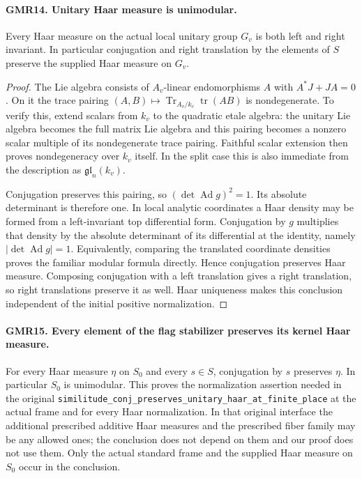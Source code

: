 \paragraph{GMR14. Unitary Haar measure is unimodular.}
\label{claim:GMR14}
Every Haar measure on the actual local unitary group $G_v$ is both
left and right invariant.  In particular conjugation and right
translation by the elements of $S$ preserve the supplied Haar measure
on $G_v$.

\begin{proof}
The Lie algebra consists of $A_v$-linear endomorphisms $A$ with
$A^*J+JA=0$.  On it the trace pairing
$(A,B)\mapsto\operatorname{Tr}_{A_v/k_v}\operatorname{tr}(AB)$ is
nondegenerate.  To verify this, extend scalars from $k_v$ to the
quadratic etale algebra: the unitary Lie algebra becomes the full
matrix Lie algebra and this pairing becomes a nonzero scalar
multiple of its nondegenerate trace pairing.  Faithful scalar
extension then proves nondegeneracy over $k_v$ itself.  In the split
case this is also immediate from the description as
$\mathfrak{gl}_n(k_v)$.

Conjugation preserves this pairing, so
$(\det\operatorname{Ad}g)^2=1$.  Its absolute determinant is therefore
one.  In local analytic coordinates a Haar density may be formed
from a left-invariant top differential form.  Conjugation by $g$
multiplies that density by the absolute determinant of its
differential at the identity, namely
$|\det\operatorname{Ad}g|=1$.
Equivalently, comparing the translated coordinate densities proves
the familiar modular formula directly.  Hence conjugation preserves
Haar measure.  Composing conjugation with a left translation gives
a right translation, so right translations preserve it as well.
Haar uniqueness makes this conclusion independent of the initial
positive normalization.
\end{proof}

\paragraph{GMR15. Every element of the flag stabilizer preserves its kernel Haar measure.}
\label{claim:GMR15}
For every Haar measure $\eta$ on $S_0$ and every $s\in S$,
conjugation by $s$ preserves $\eta$.  In particular $S_0$ is
unimodular.  This proves the normalization assertion needed in the
original \texttt{similitude\_conj\_preserves\_unitary\_haar\_at\_finite\_place}
at the actual frame and for every Haar normalization.
In that original interface the additional prescribed additive Haar
measures and the prescribed fiber family may be any allowed ones;
the conclusion does not depend on them and our proof does not use
them.  Only the actual standard frame and the supplied Haar measure
on $S_0$ occur in the conclusion.


